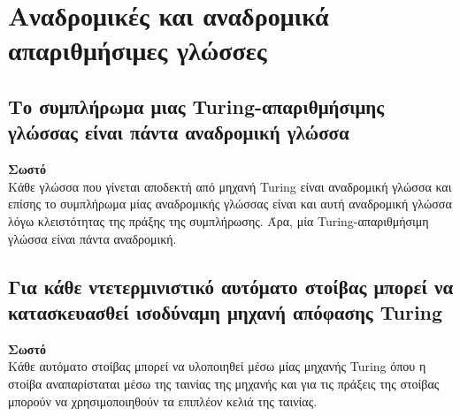 \section{Αναδρομικές και αναδρομικά απαριθμήσιμες γλώσσες}
\subsection{Το συμπλήρωμα μιας Turing-απαριθμήσιμης γλώσσας είναι πάντα αναδρομική γλώσσα}
\textbf{Σωστό}\\
Κάθε γλώσσα που γίνεται αποδεκτή από μηχανή Turing είναι αναδρομική γλώσσα και επίσης το συμπλήρωμα μίας αναδρομικής γλώσσας είναι και αυτή αναδρομική γλώσσα λόγω κλειστότητας της πράξης της συμπλήρωσης. Άρα, μία Turing-απαριθμήσιμη γλώσσα είναι πάντα αναδρομική.
\noindent\\
\subsection{Για κάθε ντετερμινιστικό αυτόματο στοίβας μπορεί να κατασκευασθεί ισοδύναμη μηχανή απόφασης Turing}
\textbf{Σωστό}\\
Κάθε αυτόματο στοίβας μπορεί να υλοποιηθεί μέσω μίας μηχανής Turing όπου η στοίβα αναπαρίσταται μέσω της ταινίας της μηχανής και για τις πράξεις της στοίβας μπορούν να χρησιμοποιηθούν τα επιπλέον κελιά της ταινίας. 
\noindent\\

